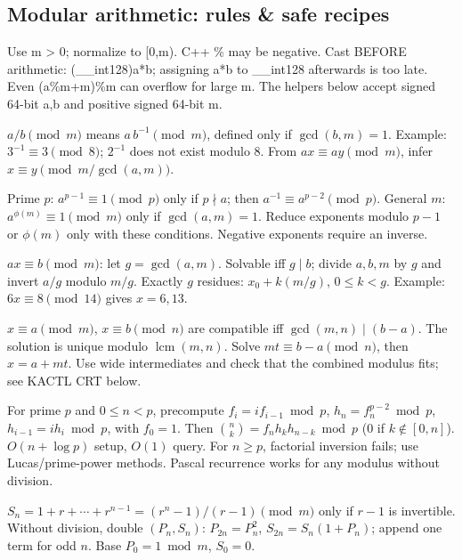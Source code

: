 \begin{multicols}{\Columns}
\subsection{Modular arithmetic: rules \& safe recipes}
 Use m \textgreater{} 0; normalize to [0,m). C++ \% may be negative. Cast BEFORE arithmetic: (\_\_int128)a*b; assigning a*b to \_\_int128 afterwards is too late. Even (a\%m+m)\%m can overflow for large m. The helpers below accept signed 64-bit a,b and positive signed 64-bit m.\par
{} $a/b\pmod m$ means $a\,b^{-1}\pmod m$, defined only if $\gcd(b,m)=1$. Example: $3^{-1}\equiv3\pmod8$; $2^{-1}$ does not exist modulo 8. From $ax\equiv ay\pmod m$, infer $x\equiv y\pmod{m/\gcd(a,m)}$.\par
{} Prime $p$: $a^{p-1}\equiv1\pmod p$ only if $p\nmid a$; then $a^{-1}\equiv a^{p-2}\pmod p$. General $m$: $a^{\phi(m)}\equiv1\pmod m$ only if $\gcd(a,m)=1$. Reduce exponents modulo $p-1$ or $\phi(m)$ only with these conditions. Negative exponents require an inverse.\par
{} $ax\equiv b\pmod m$: let $g=\gcd(a,m)$. Solvable iff $g\mid b$; divide $a,b,m$ by $g$ and invert $a/g$ modulo $m/g$. Exactly $g$ residues: $x_0+k(m/g)$, $0\le k<g$. Example: $6x\equiv8\pmod{14}$ gives $x=6,13$.\par
{} $x\equiv a\pmod m$, $x\equiv b\pmod n$ are compatible iff $\gcd(m,n)\mid(b-a)$. The solution is unique modulo $\operatorname{lcm}(m,n)$. Solve $mt\equiv b-a\pmod n$, then $x=a+mt$. Use wide intermediates and check that the combined modulus fits; see KACTL CRT below.\par
{} For prime $p$ and $0\le n<p$, precompute $f_i=i f_{i-1}\bmod p$, $h_n=f_n^{p-2}\bmod p$, $h_{i-1}=i h_i\bmod p$, with $f_0=1$. Then $\binom nk=f_nh_kh_{n-k}\bmod p$ (0 if $k\notin[0,n]$). $O(n+\log p)$ setup, $O(1)$ query. For $n\ge p$, factorial inversion fails; use Lucas/prime-power methods. Pascal recurrence works for any modulus without division.\par
{} $S_n=1+r+\cdots+r^{n-1}=(r^n-1)/(r-1)\pmod m$ only if $r-1$ is invertible. Without division, double $(P_n,S_n)$: $P_{2n}=P_n^2$, $S_{2n}=S_n(1+P_n)$; append one term for odd $n$. Base $P_0=1\bmod m$, $S_0=0$.\par
{}


\end{multicols}
